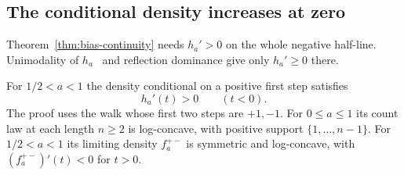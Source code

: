 \subsection{The conditional density increases at zero}

Theorem~\ref{thm:bias-continuity} needs $h_a'>0$ on the whole negative
half-line. Unimodality of $h_a$~\cite{glrs2025} and reflection
dominance give only $h_a'\ge0$ there.

\begin{lemma}\label{lem:balanced-start}
For $1/2<a<1$ the density conditional on a positive first step
satisfies
\[
 h_a'(t)>0\qquad(t<0).
\]
The proof uses the walk whose first two steps are $+1,-1$. For
$0\le a\le1$ its count law at each length $n\ge2$ is log-concave, with
positive support $\{1,\ldots,n-1\}$. For $1/2<a<1$ its limiting density
$f_a^{+-}$ is symmetric and log-concave, with $(f_a^{+-})'(t)<0$ for
$t>0$.
\end{lemma}


